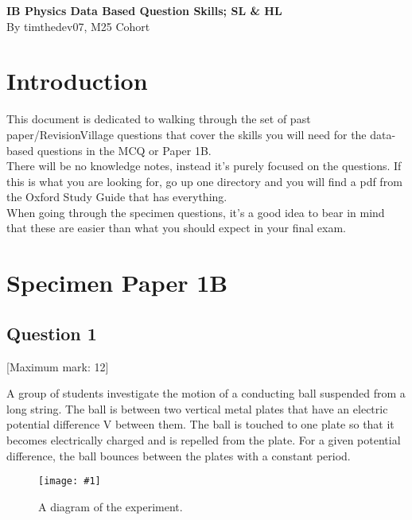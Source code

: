 \documentclass[a4paper,12pt]{article}
\let\oldsection\section
\renewcommand\section{\clearpage\oldsection}
\let\oldsubsection\subsection
\renewcommand\subsection{\clearpage\oldsubsection}
\newcommand{\lb}{\\[8pt]}
\newcommand{\img}[4]{\begin{center}
  \begin{figure}[H]
    \centering
    \texttt{[image: \#1]}
    \caption{#3}
    \label{fig:#4}
  \end{figure}
\end{center}}
\begin{document}
\pagestyle{fancy}


\begin{titlepage}
  \begin{center}

    \vspace*{8cm}
    \textbf{\Large {IB Physics Data Based Question Skills; SL \& HL}} \\
    \vspace*{1cm}
    \large{By timthedev07, M25 Cohort}

  \end{center}
\end{titlepage}

\pagebreak
\tableofcontents
\pagebreak

\clearpage
\setcounter{page}{1}

\section{Introduction}

This document is dedicated to walking through the set of past paper/RevisionVillage questions that cover the skills you will need for the data-based questions in the MCQ or Paper 1B.\lb
There will be no knowledge notes, instead it's purely focused on the questions. If this is what you are looking for, go up one directory and you will find a pdf from the Oxford Study Guide that has everything.\lb
When going through the specimen questions, it's a good idea to bear in mind that these are easier than what you should expect in your final exam.

\section{Specimen Paper 1B}

\oldsubsection{Question 1}

[Maximum mark: 12]

A group of students investigate the motion of a conducting ball suspended from a long string.
The ball is between two vertical metal plates that have an electric potential difference V
between them. The ball is touched to one plate so that it becomes electrically charged and
is repelled from the plate. For a given potential difference, the ball bounces between the
plates with a constant period.

\img{ex/1.png}{0.3}{A diagram of the experiment.}{1}
\end{document}
